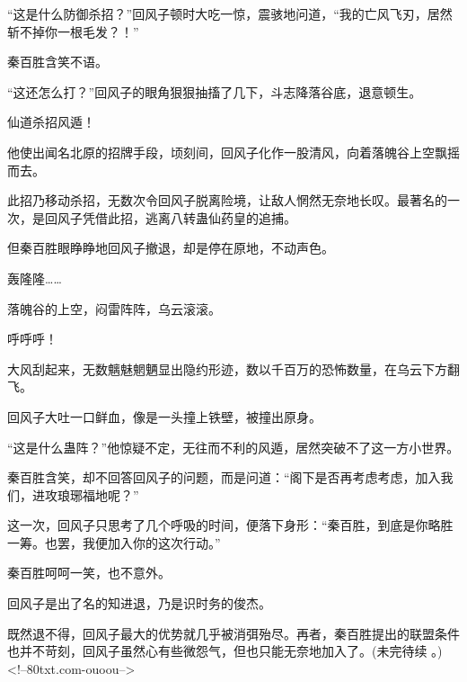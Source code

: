 \begin{this_body}
“这是什么防御杀招？”回风子顿时大吃一惊，震骇地问道，“我的亡风飞刃，居然斩不掉你一根毛发？！”

秦百胜含笑不语。

“这还怎么打？”回风子的眼角狠狠抽搐了几下，斗志降落谷底，退意顿生。

仙道杀招风遁！

他使出闻名北原的招牌手段，顷刻间，回风子化作一股清风，向着落魄谷上空飘摇而去。

此招乃移动杀招，无数次令回风子脱离险境，让敌人惘然无奈地长叹。最著名的一次，是回风子凭借此招，逃离八转蛊仙药皇的追捕。

但秦百胜眼睁睁地回风子撤退，却是停在原地，不动声色。

轰隆隆……

落魄谷的上空，闷雷阵阵，乌云滚滚。

呼呼呼！

大风刮起来，无数魑魅魍魉显出隐约形迹，数以千百万的恐怖数量，在乌云下方翻飞。

回风子大吐一口鲜血，像是一头撞上铁壁，被撞出原身。

“这是什么蛊阵？”他惊疑不定，无往而不利的风遁，居然突破不了这一方小世界。

秦百胜含笑，却不回答回风子的问题，而是问道：“阁下是否再考虑考虑，加入我们，进攻琅琊福地呢？”

这一次，回风子只思考了几个呼吸的时间，便落下身形：“秦百胜，到底是你略胜一筹。也罢，我便加入你的这次行动。”

秦百胜呵呵一笑，也不意外。

回风子是出了名的知进退，乃是识时务的俊杰。

既然退不得，回风子最大的优势就几乎被消弭殆尽。再者，秦百胜提出的联盟条件也并不苛刻，回风子虽然心有些微怨气，但也只能无奈地加入了。(未完待续 。)<!--80txt.com-ouoou-->

\end{this_body}

